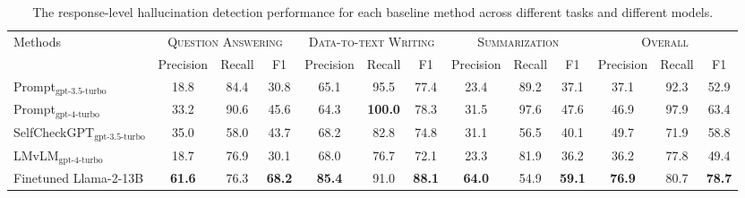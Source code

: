 \begin{table}[t]
\scriptsize
\centering
    \begin{tabular}{l|ccccccccc|ccc}
    \toprule
    \multirow{2}{*}{Methods}
     & \multicolumn{3}{c}{\textsc{Question Answering}} & \multicolumn{3}{c}{\textsc{Data-to-text Writing}} & \multicolumn{3}{c}{\textsc{Summarization}} & \multicolumn{3}{c}{\textsc{Overall}}  \\
     \cmidrule(lr){2-4} \cmidrule(lr){5-7} \cmidrule(lr){8-10}  \cmidrule(lr){11-13} 
     & Precision & Recall & F1 & Precision & Recall & F1 & Precision & Recall & F1 & Precision & Recall & F1\\
     \midrule
     Prompt$_\textrm{gpt-3.5-turbo}$ & 18.8 & 84.4 & 30.8 & 65.1 & 95.5 & 77.4 & 23.4 & 89.2 & 37.1 & 37.1 & 92.3 & 52.9\\
     Prompt$_\textrm{gpt-4-turbo}$ & 33.2 & 90.6 & 45.6 & 64.3 & \textbf{100.0} & 78.3 & 31.5 & 97.6 & 47.6 & 46.9 & 97.9 & 63.4\\
     SelfCheckGPT$_\textrm{gpt-3.5-turbo}$ & 35.0 & 58.0 & 43.7 & 68.2 & 82.8 & 74.8 & 31.1  & 56.5 & 40.1 & 49.7 & 71.9 & 58.8\\
     LMvLM$_\textrm{gpt-4-turbo}$ & 18.7 & 76.9 & 30.1 &68.0 & 76.7 & 72.1 & 23.3 & 81.9 & 36.2 & 36.2 & 77.8 & 49.4\\
     Finetuned Llama-2-13B & \textbf{61.6} & 76.3 & \textbf{68.2} & \textbf{85.4} & 91.0 &\textbf{88.1} & \textbf{64.0} & 54.9 &\textbf{59.1} &\textbf{76.9} & 80.7 & \textbf{78.7}  \\
    \bottomrule
    \end{tabular}
    \caption{The response-level hallucination detection performance for each baseline method across different tasks and different models. 
    }
    \label{tab:5-detection-result}
\end{table}